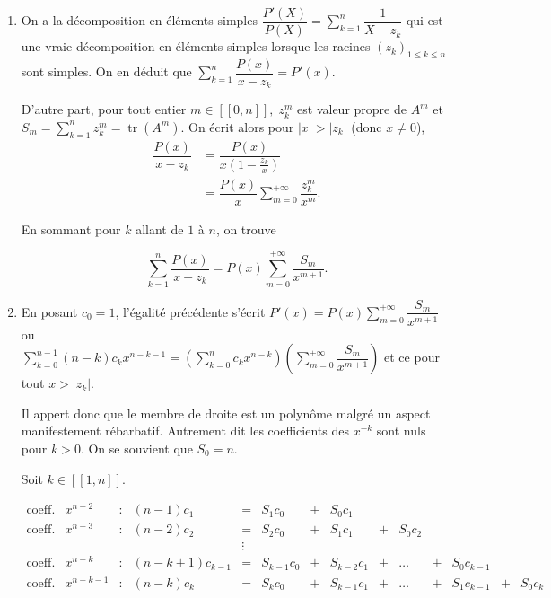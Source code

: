 \begin{enumerate}
 
\item 
 
On a la \og décomposition en éléments simples \fg{} \( \dfrac{P'(X)}{P(X)} = \displaystyle\sum_{k=1}^n \dfrac{1}{X-z_k} \) qui est une vraie décomposition en éléments simples lorsque les racines \( (z_k)_{1\leqslant k \leqslant n} \) sont simples.
On en déduit que \( \displaystyle\sum_{k=1}^n \dfrac{P(x)}{x-z_k} = P'(x) \).
 
D'autre part, pour tout entier \( m \in [\![0,n]\!], \; z_k^m \) est valeur propre de \( A^m \) et \( S_m = \sum\limits_{k=1}^n z_k^m = \operatorname{tr}(A^m) \).
On écrit alors pour \( \vert x \vert > \vert z_k \vert \) (donc \( x \neq 0\)),
\begin{align*}
\dfrac{P(x)}{x-z_k} &= \dfrac{P(x)}{x\left(1-\frac{z_k}{x}\right) }\\
&= \dfrac{P(x)}{x} \sum_{m=0}^{+\infty}\dfrac{z_k^m}{x^m}.
\end{align*}
 
En sommant pour \( k \) allant de \( 1 \) à \( n \), on trouve
 
\[ \sum_{k=1}^n \dfrac{P(x)}{x-z_k} = P(x) \sum_{m=0}^{+\infty}\dfrac{S_m}{x^{m+1}}. \]
 
\item 
 
En posant \( c_0 = 1 \), l'égalité précédente s'écrit \( P'(x) = P(x) \sum\limits_{m=0}^{+\infty}\dfrac{S_m}{x^{m+1}} \) ou\\
 
\( \sum\limits_{k=0}^{n-1} (n-k)c_kx^{n-k-1}  = \left( \sum\limits_{k=0}^{n} c_kx^{n-k} \right) \left( \sum\limits_{m=0}^{+\infty}\dfrac{S_m}{x^{m+1}} \right) \) et ce pour tout \( x > \vert z_k \vert \).
 
Il appert donc que le membre de droite est un polynôme malgré un aspect manifestement rébarbatif. Autrement dit les coefficients des \( x^{-k} \) sont nuls pour \( k > 0 \). On se souvient que \( S_0 = n \).
 
Soit \( k \in [\![1,n]\!] \).
 
\[ \begin{array}{rrrrrrrrrrrrrr}
\text{coeff. de}&x^{n-2}&:&(n-1)c_1&=&S_1c_0&+&S_0c_1& &      & & & &
\\
\text{coeff. de}&x^{n-3}&:&(n-2)c_2&=&S_2c_0&+&S_1c_1&+&S_0c_2& & & &
\\
                     &       & & & \vdots &      & &      & &      & & & &
\\
\text{coeff. de}&x^{n-k}&:&(n-k+1)c_{k-1}&=&S_{k-1}c_0&+&S_{k-2}c_1&+&\ldots&+&S_0c_{k-1}& &
\\
\text{coeff. de}&x^{n-k-1}&:&(n-k)c_{k}&=&S_{k}c_0&+&S_{k-1}c_1&+&\ldots&+&S_1c_{k-1}&+&S_0c_{k}
\end{array} \]
 

\end{enumerate}
